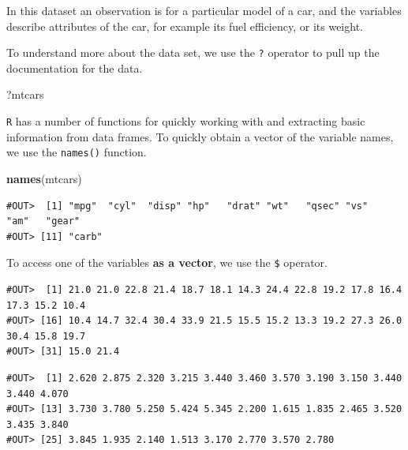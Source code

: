 \documentclass[]{book}
\newenvironment{Shaded}{\begin{snugshade}}{\end{snugshade}}
\newcommand{\KeywordTok}[1]{\textcolor[rgb]{0.13,0.29,0.53}{\textbf{#1}}}
\newcommand{\OperatorTok}[1]{\textcolor[rgb]{0.81,0.36,0.00}{\textbf{#1}}}
\newcommand{\NormalTok}[1]{#1}
\begin{document}
In this dataset an observation is for a particular model of a car, and
the variables describe attributes of the car, for example its fuel
efficiency, or its weight.

To understand more about the data set, we use the \texttt{?} operator to
pull up the documentation for the data.

\begin{Shaded}
\begin{Highlighting}[]
\NormalTok{?mtcars}
\end{Highlighting}
\end{Shaded}

\texttt{R} has a number of functions for quickly working with and
extracting basic information from data frames. To quickly obtain a
vector of the variable names, we use the \texttt{names()} function.

\begin{Shaded}
\begin{Highlighting}[]
\KeywordTok{names}\NormalTok{(mtcars)}
\end{Highlighting}
\end{Shaded}

\begin{verbatim}
#OUT>  [1] "mpg"  "cyl"  "disp" "hp"   "drat" "wt"   "qsec" "vs"   "am"   "gear"
#OUT> [11] "carb"
\end{verbatim}

To access one of the variables \textbf{as a vector}, we use the
\texttt{\$} operator.

\begin{Shaded}
\end{Shaded}

\begin{verbatim}
#OUT>  [1] 21.0 21.0 22.8 21.4 18.7 18.1 14.3 24.4 22.8 19.2 17.8 16.4 17.3 15.2 10.4
#OUT> [16] 10.4 14.7 32.4 30.4 33.9 21.5 15.5 15.2 13.3 19.2 27.3 26.0 30.4 15.8 19.7
#OUT> [31] 15.0 21.4
\end{verbatim}

\begin{Shaded}
\end{Shaded}

\begin{verbatim}
#OUT>  [1] 2.620 2.875 2.320 3.215 3.440 3.460 3.570 3.190 3.150 3.440 3.440 4.070
#OUT> [13] 3.730 3.780 5.250 5.424 5.345 2.200 1.615 1.835 2.465 3.520 3.435 3.840
#OUT> [25] 3.845 1.935 2.140 1.513 3.170 2.770 3.570 2.780
\end{verbatim}
\end{document}
